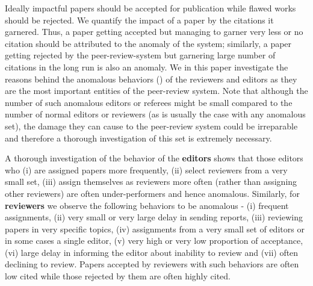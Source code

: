 Ideally impactful papers should be accepted for publication while flawed works should be rejected. We quantify the impact of a paper by the citations it garnered. Thus, a paper getting accepted but managing to garner very less or no citation should be attributed to the anomaly of the system; similarly, a paper getting rejected by the peer-review-system but garnering large number of citations in the long run is also an anomaly. 
We in this paper investigate the reasons behind the anomalous behaviors (\cite{chandola2009anomaly}) of the reviewers and editors as they are the most important entities of the peer-review system. 
Note that although the number of such anomalous editors or referees might be small compared to the number of normal editors or reviewers  (as is usually the case with any anomalous set), the damage they can cause to the peer-review system could be irreparable and therefore a thorough investigation of this set is extremely necessary. 

 A thorough investigation of the behavior of the {\bf editors} shows that those editors who (i) are assigned papers more frequently, (ii) select reviewers from a very small set, (iii) assign themselves as reviewers more often (rather than assigning other reviewers) are often under-performers and hence anomalous.  
Similarly, for {\bf reviewers} we observe the following behaviors to be anomalous - (i) frequent assignments, (ii) very small or very large delay in sending reports, (iii) reviewing papers in very specific topics, (iv) assignments from a very small set of editors or in some cases a single editor, (v) very high or very low proportion of acceptance,  (vi) large delay in informing the editor about inability to review and (vii) often declining to review. Papers accepted by reviewers with such behaviors are often low cited while those rejected by them are often highly cited.

